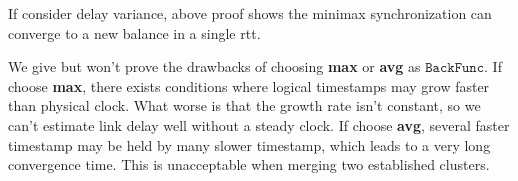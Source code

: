 \begin{note}
	If consider delay variance, above proof shows the minimax synchronization can converge to a new balance in a single rtt.
\end{note}

\begin{note}
	We give but won't prove the drawbacks of choosing \textbf{max} or \textbf{avg} as $\texttt{BackFunc}$.
	If choose \textbf{max}, there exists conditions where logical timestamps may grow faster than physical clock.
	What worse is that the growth rate isn't constant, so we can't estimate link delay well without a steady clock.
	If choose \textbf{avg}, several faster timestamp may be held by many slower timestamp, which leads to a very long convergence time.
	This is unacceptable when merging two established clusters.
\end{note}
\fi